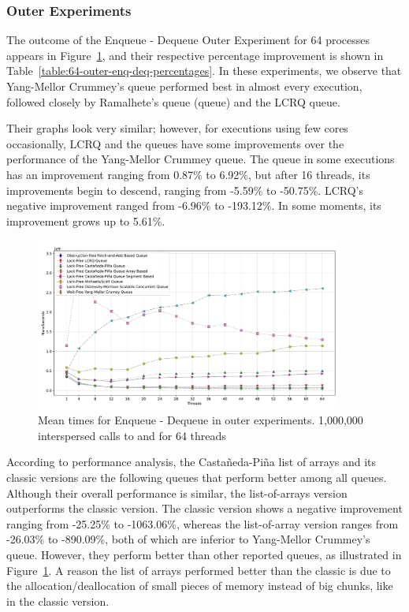 %



\subsubsection{\label{subsec:outer-experiments}Outer Experiments}

The outcome of the Enqueue - Dequeue Outer Experiment for 64 processes appears in Figure~\ref{fig:64-outer--enq-deq}, and their respective percentage improvement is shown in Table~\ref{table:64-outer-enq-deq-percentages}. In these experiments, we observe that Yang-Mellor Crummey's queue performed best in almost every execution, followed closely by Ramalhete's \FAI queue (\FAI queue) and the LCRQ queue.


Their graphs look very similar; however, for executions using few cores occasionally, LCRQ and the \FAI queues have some improvements over the performance of the Yang-Mellor Crummey queue. The \FAI queue in some executions has an improvement ranging from 0.87\% to 6.92\%, but after 16 threads, its improvements begin to descend, ranging from -5.59\% to -50.75\%. LCRQ's negative improvement ranged from -6.96\% to -193.12\%. In some moments, its improvement grows up to 5.61\%.


\begin{figure}[ht!]
  \centering
  \includegraphics[width=0.9\textwidth]{contents/figures/V_64_outer_enq_deq_all.pdf}
  \caption{\label{fig:64-outer--enq-deq} Mean times for Enqueue - Dequeue in outer experiments. 1,000,000 interspersed calls to \Enq and \Deq  for 64 threads}
\end{figure}

According to performance analysis, the Castañeda-Piña list of arrays and its classic versions are the following queues that perform better among all queues. Although their overall performance is similar, the list-of-arrays version outperforms the classic version. The classic version shows a negative improvement ranging from -25.25\% to -1063.06\%, whereas the list-of-array version ranges from -26.03\% to -890.09\%, both of which are inferior to Yang-Mellor Crummey's queue. However, they perform better than other reported queues, as illustrated in Figure~\ref{fig:64-outer--enq-deq}. A reason the list of arrays performed better than the classic is due to the allocation/deallocation of small pieces of memory instead of big chunks, like in the classic version.


